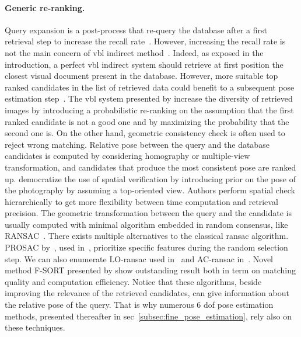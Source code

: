 \paragraph{Generic re-ranking.}
Query expansion is a post-process that re-query the database after a first retrieval step to increase the recall rate~\citep{Chum2007,Chum2011,Tolias2014}. However, increasing the recall rate is not the main concern of \ac{vbl} indirect method~\citep{Sattler2012}. Indeed, as exposed in the introduction, a perfect \ac{vbl} indirect system should retrieve at first position the closest visual document present in the database. However, more suitable top ranked candidates in the list of retrieved data could benefit to a subsequent pose estimation step~\citep{Song2016}. The \ac{vbl} system presented by \citet{Cao2013} increase the diversity of retrieved images by introducing a probabilistic re-ranking on the assumption that the first ranked candidate is not a good one and by maximizing the probability that the second one is.
\label{par:ransac}
On the other hand, geometric consistency check is often used to reject wrong matching. Relative pose between the query and the database candidates is computed by considering homography or multiple-view transformation, and candidates that produce the most consistent pose are ranked up. \citet{Philbin2007} democratize the use of spatial verification by introducing prior on the pose of the photography by assuming a top-oriented view. Authors perform spatial check hierarchically to get more flexibility between time computation and retrieval precision. The geometric transformation between the query and the candidate is usually computed with minimal algorithm embedded in random consensus, like RANSAC~\citep{Fischler1981}. There exists multiple alternatives to the classical \ac{ransac} algorithm. PROSAC by~\citep{Chum2005}, used in~\citep{Donoser2014}, prioritize specific features during the random selection step. We can also enumerate LO-\ac{ransac} used in~\citep{Philbin2007} and AC-\ac{ransac} in~\citep{Qu2015,Qu2016}. Novel method F-SORT presented by \citet{Chan2016} show outstanding result both in term on matching quality and computation efficiency. Notice that these algorithms, beside improving the relevance of the retrieved candidates, can give information about the relative pose of the query. That is why numerous 6 \ac{dof} pose estimation methods, presented thereafter in \acs{sec}~\ref{subsec:fine_pose_estimation}, rely also on these techniques.


